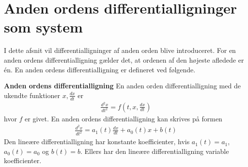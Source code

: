 \section{Anden ordens differentialligninger som system}

I dette afsnit vil differentialligninger af anden orden blive introduceret. For en anden ordens differentialligning gælder det, at ordenen af den højeste afledede er én. En anden ordens differentialligning er defineret ved følgende. 
\begin{defn}\textbf{Anden ordens differentialligning} %
\newline
En anden orden differentialligning med de ukendte funktioner $x, \frac{dx}{dt}$ er 
\begin{align*}
    \frac{d^2x}{dt^2} = f\left(t, x, \frac{dx}{dt}\right)
\end{align*}
hvor $f$ er givet. En anden ordens differentialligning kan skrives på formen
\begin{align*}
    \frac{d^2x}{dt^2}=a_1(t)\frac{dx}{dt}+a_0(t)x + b(t)
\end{align*}
Den lineære differentialligning har konstante koefficienter, hvis $a_1(t)=a_1$, $a_0(t)=a_0$ og $b(t)=b$. Ellers har den lineære differentialligning variable koefficienter.
\end{defn}



